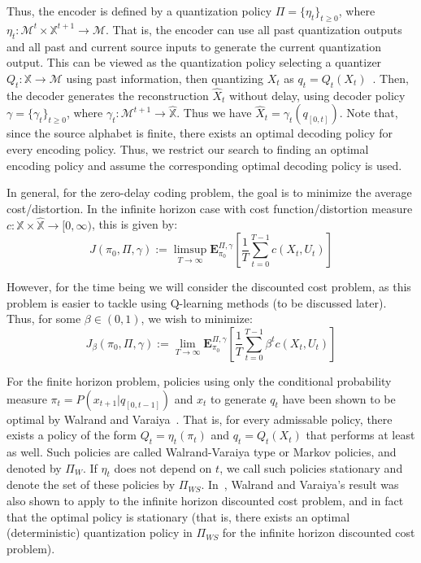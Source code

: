 \documentclass{article}
\begin{document}
Thus, the encoder is defined by a quantization policy \( \Pi = \{\eta_t\}_{t \ge 0} \), where \( \eta_t : \mathcal{M}^t \times \mathbb{X}^{t+1} \to \mathcal{M} \). That is, the encoder can use all past quantization outputs and all past and current source inputs to generate the current quantization output. This can be viewed as the quantization policy selecting a quantizer \( Q_t : \mathbb{X} \to \mathcal{M} \) using past information, then quantizing \( X_t \) as \( q_t = Q_t(X_t) \)~\cite{Linder}. Then, the decoder generates the reconstruction \( \hat{X}_t \) without delay, using decoder policy \( \gamma = \{\gamma_t\}_{t \ge 0} \), where \( \gamma_t : \mathcal{M}^{t+1} \to \hat{\mathbb{X}} \). Thus we have \( \hat{X}_t = \gamma_t(q_{[0,t]}) \). Note that, since the source alphabet is finite, there exists an optimal decoding policy for every encoding policy. Thus, we restrict our search to finding an optimal encoding policy and assume the corresponding optimal decoding policy is used. %

In general, for the zero-delay coding problem, the goal is to minimize the average cost/distortion. In the infinite horizon case with cost function/distortion measure \( c : \mathbb{X} \times \hat{\mathbb{X}} \to [0,\infty) \), this is given by: %
\[ J(\pi_0, \Pi, \gamma) := \limsup_{T\to\infty}\mathbf{E}_{\pi_0}^{\Pi, \gamma}\left[\frac{1}{T}\sum_{t=0}^{T-1}c(X_t,U_t)\right] \]

However, for the time being we will consider the discounted cost problem, as this problem is easier to tackle using Q-learning methods (to be discussed later). Thus, for some \( \beta \in (0,1) \), we wish to minimize:
\[ J_{\beta}(\pi_0, \Pi, \gamma) := \lim_{T\to\infty}\mathbf{E}_{\pi_0}^{\Pi, \gamma}\left[\frac{1}{T}\sum_{t=0}^{T-1}\beta^t c(X_t,U_t)\right] \]

For the finite horizon problem, policies using only the conditional probability measure \( \pi_t = P(x_{t+1}|q_{[0,t-1]}) \) and \( x_t \) to generate \( q_t \) have been shown to be optimal by Walrand and Varaiya~\cite{Walrand}. That is, for every admissable policy, there exists a policy of the form \( Q_t = \eta_t(\pi_t) \) and \( q_t = Q_t(X_t) \) that performs at least as well. Such policies are called Walrand-Varaiya type or Markov policies, and denoted by \( \Pi_{W} \). If \( \eta_t \) does not depend on \( t \), we call such policies stationary and denote the set of these policies by \( \Pi_{WS} \). In~\cite{Wood}, Walrand and Varaiya's result was also shown to apply to the infinite horizon discounted cost problem, and in fact that the optimal policy is stationary (that is, there exists an optimal (deterministic) quantization policy in \( \Pi_{WS} \) for the infinite horizon discounted cost problem).
\end{document}
